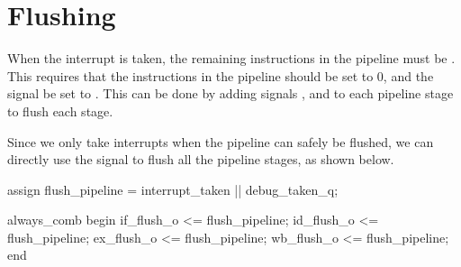 %
%
%
%
%
%
%
%
%
%

\section{Flushing}



When the interrupt is taken, the remaining instructions in the pipeline must be . This requires that the instructions in the pipeline should be set to 0, and the  signal be set to . This can be done by adding signals , and  to each pipeline stage to flush each stage.

Since we only take interrupts when the pipeline can safely be flushed, we can directly use the  signal to flush all the pipeline stages, as shown below.

\begin{systemverilog}
    assign flush_pipeline = interrupt_taken || debug_taken_q;

    always_comb begin
        if_flush_o <= flush_pipeline;
        id_flush_o <= flush_pipeline;
        ex_flush_o <= flush_pipeline;
        wb_flush_o <= flush_pipeline;
    end
\end{systemverilog}


